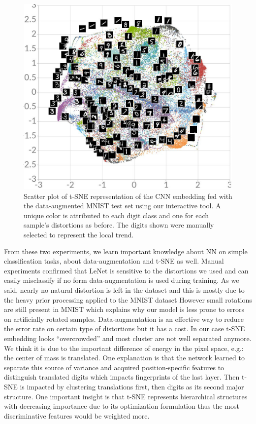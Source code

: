 \documentclass[a4paper,12pt]{report}
\newcommand{\eg}{e.g.}
\begin{document}
\begin{figure}[t]
    \begin{center}
        \includegraphics[width=\textwidth]{thesis_figures/mnist_da_tsne.jpg}
    \end{center}
    \caption{Scatter plot of t-SNE representation of the CNN embedding fed with the data-augmented MNIST test set using our interactive tool. A unique color is attributed to each digit class and one for each sample's distortions as before. The digits shown were manually selected to represent the local trend.}
    \label{fig:mnist_da_tsne}
\end{figure}

From these two experiments, we learn important knowledge about NN on simple classification tasks, about data-augmentation and t-SNE as well.
Manual experiments confirmed that LeNet is sensitive to the distortions we used and can easily misclassify if no form data-augmentation is used during training.
As we said, nearly no natural distortion is left in the dataset and this is mostly due to the heavy prior processing applied to the MNIST dataset
However small rotations are still present in MNIST which explains why our model is less prone to errors on artificially rotated samples.
Data-augmentation is an effective way to reduce the error rate on certain type of distortions but it has a cost.
In our case t-SNE embedding looks ``overcrowded'' and most cluster are not well separated anymore.
We think it is due to the important difference of energy in the pixel space, \eg: the center of mass is translated.
One explanation is that the network learned to separate this source of variance and acquired position-specific features to distinguish translated digits which impacts fingerprints of the last layer.
Then t-SNE is impacted by clustering translations first, then digits as its second major structure.
One important insight is that t-SNE represents hierarchical structures with decreasing importance due to its optimization formulation thus the most discriminative features would be weighted more.
\end{document}

